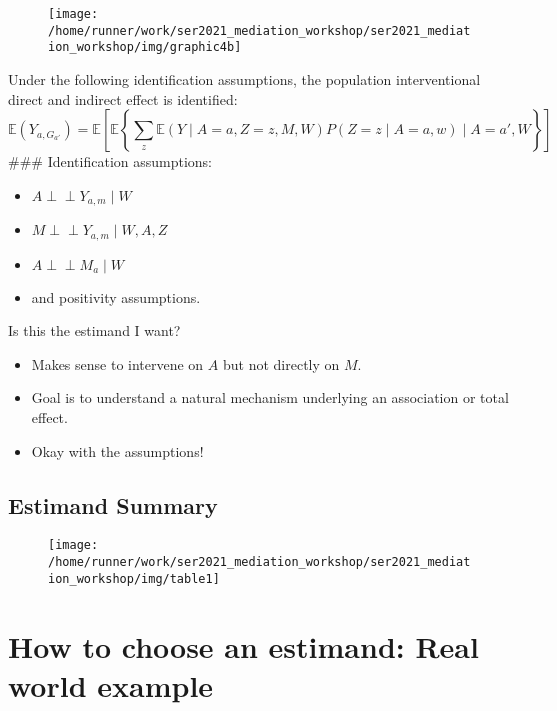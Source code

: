 \documentclass[
  12pt,
]{book}
\providecommand{\tightlist}{%
  \setlength{\itemsep}{0pt}\setlength{\parskip}{0pt}}
\theoremstyle{definition}
\theoremstyle{definition}
\theoremstyle{definition}
\newcommand{\indep}{\mbox{$\perp\!\!\!\perp$}}
\newcommand{\E}{\mathbb{E}}
\newcommand{\1}{\mathbbm{1}}
\begin{document}
\begin{figure}

{\centering \texttt{[image: /home/runner/work/ser2021\_mediation\_workshop/ser2021\_mediation\_workshop/img/graphic4b]} 

}

\end{figure}

Under the following identification assumptions, the population interventional direct and indirect effect is identified:
\[
\E(Y_{a, G_{a'}}) = \E\left[\E\left\{\sum_z\E(Y \mid A=a, Z=z, M, W) P(Z=z \mid A=a, w)\mid A=a', W\right\}\right]
\]
\#\#\# Identification assumptions:

\begin{itemize}
\tightlist
\item
  \(A \indep Y_{a,m} \mid W\)
\item
  \(M \indep Y_{a,m} \mid W, A, Z\)
\item
  \(A \indep M_a \mid W\)
\item
  and positivity assumptions.
\end{itemize}

Is this the estimand I want?

\begin{itemize}
\tightlist
\item
  Makes sense to intervene on \(A\) but not directly on \(M\).
\item
  Goal is to understand a natural mechanism underlying an association or total
  effect.
\item
  Okay with the assumptions!
\end{itemize}

\hypertarget{estimand-summary}{%
\section{Estimand Summary}\label{estimand-summary}}

\begin{figure}

{\centering \texttt{[image: /home/runner/work/ser2021\_mediation\_workshop/ser2021\_mediation\_workshop/img/table1]} 

}

\end{figure}

\hypertarget{estimandirl}{%
\chapter{How to choose an estimand: Real world example}\label{estimandirl}}
\end{document}

